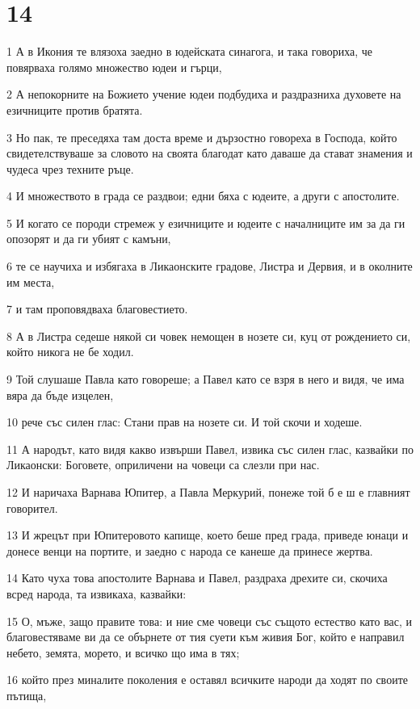 \chapter{14}

\par 1 А в Икония те влязоха заедно в юдейската синагога, и така говориха, че повярваха голямо множество юдеи и гърци,
\par 2 А непокорните на Божието учение юдеи подбудиха и раздразниха духовете на езичниците против братята.
\par 3 Но пак, те преседяха там доста време и дързостно говореха в Господа, който свидетелствуваше за словото на своята благодат като даваше да стават знамения и чудеса чрез техните ръце.
\par 4 И множеството в града се раздвои; едни бяха с юдеите, а други с апостолите.
\par 5 И когато се породи стремеж у езичниците и юдеите с началниците им за да ги опозорят и да ги убият с камъни,
\par 6 те се научиха и избягаха в Ликаонските градове, Листра и Дервия, и в околните им места,
\par 7 и там проповядваха благовестието.
\par 8 А в Листра седеше някой си човек немощен в нозете си, куц от рождението си, който никога не бе ходил.
\par 9 Той слушаше Павла като говореше; а Павел като се взря в него и видя, че има вяра да бъде изцелен,
\par 10 рече със силен глас: Стани прав на нозете си. И той скочи и ходеше.
\par 11 А народът, като видя какво извърши Павел, извика със силен глас, казвайки по Ликаонски: Боговете, оприличени на човеци са слезли при нас.
\par 12 И наричаха Варнава Юпитер, а Павла Меркурий, понеже той б е ш е главният говорител.
\par 13 И жрецът при Юпитеровото капище, което беше пред града, приведе юнаци и донесе венци на портите, и заедно с народа се канеше да принесе жертва.
\par 14 Като чуха това апостолите Варнава и Павел, раздраха дрехите си, скочиха всред народа, та извикаха, казвайки:
\par 15 О, мъже, защо правите това: и ние сме човеци със същото естество като вас, и благовестяваме ви да се обърнете от тия суети към живия Бог, който е направил небето, земята, морето, и всичко що има в тях;
\par 16 който през миналите поколения е оставял всичките народи да ходят по своите пътища,

